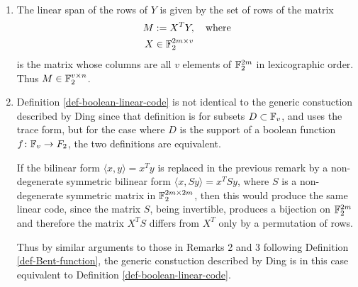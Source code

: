 \begin{remarks}~

\begin{enumerate}
 \item
The linear span of the rows of $Y$ is given by the set of rows of the matrix
%
\begin{align*}
M &:= X^T Y, \quad \text{where}
\\
X &\in \mathbb{F}_2^{2m \times v}
\end{align*}
is the matrix whose columns are all $v$ elements of $\mathbb{F}_2^{2m}$ in lexicographic order.
Thus $M \in \mathbb{F}_2^{v \times n}$.
 \item
Definition \ref{def-boolean-linear-code} is not identical to the generic constuction described by
Ding \cite[Section III]{Din2015} since that definition is for
subsets $D \subset \mathbb{F}_v$, and uses the trace form, but for the case where $D$ is the support
of a boolean function $f \colon \mathbb{F}_v \rightarrow F_2$, the two definitions are equivalent.

If the bilinear form $\langle x, y \rangle = x^T y$ is replaced in
the previous remark by a non-degenerate symmetric bilinear form $\langle x, S y \rangle = x^T S y$,
where $S$ is a non-degenerate symmetric matrix in $\mathbb{F}_2^{2m \times 2m}$,
then this would produce the same linear code, since the matrix $S$, being invertible,
produces a bijection on $\mathbb{F}_2^{2m}$ and therefore the matrix $X^T S$ differs from $X^T$ only by a permutation of rows.

Thus by similar arguments to those in Remarks 2 and 3 following Definition \ref{def-Bent-function},
the generic constuction described by Ding \cite[Section III]{Din2015} is in this case equivalent
to Definition \ref{def-boolean-linear-code}.
\end{enumerate}
\end{remarks}

